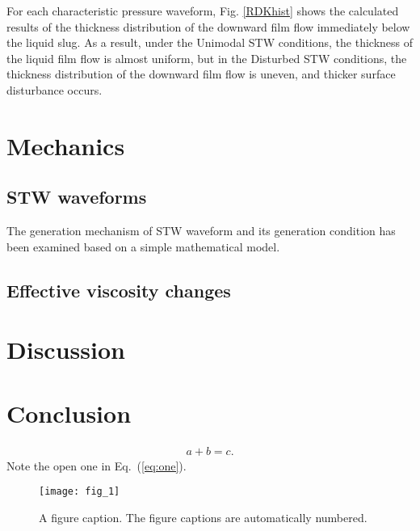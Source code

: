 \documentclass[aps,pre,preprint,groupedaddress,showkeys]{revtex4-2}
\begin{document}
For each characteristic pressure waveform, Fig. \ref{RDKhist} shows the calculated results of the thickness distribution of the downward film flow immediately below the liquid slug.
As a result, under the Unimodal STW conditions, the thickness of the liquid film flow is almost uniform, but in the Disturbed STW conditions, the thickness distribution of the downward film flow is uneven, and thicker surface disturbance occurs.



\section{Mechanics}\label{mec}
\subsection{STW waveforms}
The generation mechanism of STW waveform and its generation condition has been examined based on a simple mathematical model.


\subsection{Effective viscosity changes}

\section{Discussion}\label{mec}

\section{Conclusion}\label{con}


\begin{eqnarray}
a+b=c
\label{eq:one}.
\end{eqnarray}
Note the open one in Eq.~(\ref{eq:one}).

\begin{figure}
\texttt{[image: fig\_1]}%
\caption{\label{fig:epsart} A figure caption. The figure captions are automatically numbered.}
\end{figure}


\end{document}
